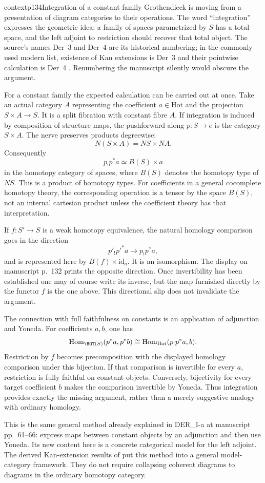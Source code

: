 \begin{dcomment}{context}{p134}{Integration of a constant family}
Grothendieck is moving from a presentation of diagram categories to their operations. The word ``integration'' expresses the geometric idea: a family of spaces parametrized by $S$ has a total space, and the left adjoint to restriction should recover that total object. The source's names Der~3 and Der~4 are its historical numbering; in the commonly used modern list, existence of Kan extensions is Der~3 and their pointwise calculation is Der~4 \citep[Definition~1.5]{Groth2013}. Renumbering the manuscript silently would obscure the argument.

For a constant family the expected calculation can be carried out at once. Take an actual category $A$ representing the coefficient $a\in\mathrm{Hot}$ and the projection $S\times A\to S$. It is a split fibration with constant fibre $A$. If integration is induced by composition of structure maps, the pushforward along $p:S\to e$ is the category $S\times A$. The nerve preserves products degreewise:
\[
 N(S\times A)=NS\times NA.
\]
Consequently
\[
 p_!p^*a\simeq B(S)\times a
\]
in the homotopy category of spaces, where $B(S)$ denotes the homotopy type of $NS$. This is a product of homotopy types. For coefficients in a general cocomplete homotopy theory, the corresponding operation is a tensor by the space $B(S)$, not an internal cartesian product unless the coefficient theory has that interpretation.

If $f:S'\to S$ is a weak homotopy equivalence, the natural homology comparison goes in the direction
\[
 p'_!p'^*a\longrightarrow p_!p^*a,
\]
and is represented here by $B(f)\times\mathrm{id}_a$. It is an isomorphism. The display on manuscript p.~132 prints the opposite direction. Once invertibility has been established one may of course write its inverse, but the map furnished directly by the functor $f$ is the one above. This directional slip does not invalidate the argument.

The connection with full faithfulness on constants is an application of adjunction and Yoneda. For coefficients $a,b$, one has
\[
 \mathrm{Hom}_{\HOT(S)}(p^*a,p^*b)
  \cong \mathrm{Hom}_{\mathrm{Hot}}(p_!p^*a,b).
\]
Restriction by $f$ becomes precomposition with the displayed homology comparison under this bijection. If that comparison is invertible for every $a$, restriction is fully faithful on constant objects. Conversely, bijectivity for every target coefficient $b$ makes the comparison invertible by Yoneda. Thus integration provides exactly the missing argument, rather than a merely suggestive analogy with ordinary homology.

This is the same general method already explained in DER\_I-a at manuscript pp.~61--66: express maps between constant objects by an adjunction and then use Yoneda. Its new content here is a concrete categorical model for the left adjoint. The derived Kan-extension results of \citet{Cisinski2003} put this method into a general model-category framework. They do not require collapsing coherent diagrams to diagrams in the ordinary homotopy category.
\end{dcomment}

